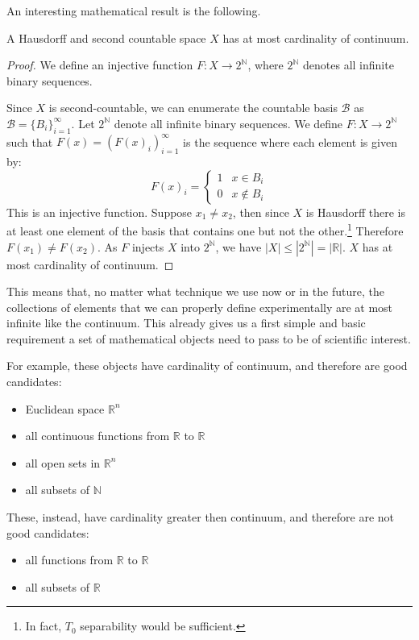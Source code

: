 \documentclass[11pt,letterpaper,fleqn]{memoir} %
\begin{document}
An interesting mathematical result is the following.

\begin{prop}
	A Hausdorff and second countable space $X$ has at most cardinality of continuum.
\end{prop}

\begin{proof}
	We define an injective function $F:X\to2^{\mathbb{N}}$, where $2^{\mathbb{N}}$ denotes all infinite binary sequences.
	
	Since $X$ is second-countable, we can enumerate the countable basis $\mathcal{B}$ as $\mathcal{B} = \{B_i\}_{i=1}^{\infty}$. Let $2^{\mathbb{N}}$ denote all infinite binary sequences. We define $F:X\to2^{\mathbb{N}}$ such that $F(x) = (F(x)_i)_{i=1}^{\infty}$ is the sequence where each element is given by: 
	$$
	F(x)_i = 
	\begin{cases}
	1 & x\in B_i \\
	0 & x\notin B_i
	\end{cases}
	$$
	This is an injective function. Suppose $x_1 \neq x_2$, then since $X$ is Hausdorff there is at least one element of the basis that contains one but not the other.\footnote{In fact, $T_0$ separability would be sufficient.} Therefore $F(x_1) \neq F(x_2)$. As $F$ injects $X$ into $2^{\mathbb{N}}$, we have $|X| \leq |2^{\mathbb{N}}|=|\mathbb{R}|$. $X$ has at most cardinality of continuum.
\end{proof}

This means that, no matter what technique we use now or in the future, the collections of elements that we can properly define experimentally are at most infinite like the continuum. This already gives us a first simple and basic requirement a set of mathematical objects need to pass to be of scientific interest.

For example, these objects have cardinality of continuum, and therefore are good candidates:
\begin{itemize}
	\item Euclidean space $\mathbb{R}^n$
	\item all continuous functions from $\mathbb{R}$ to $\mathbb{R}$
	\item all open sets in $\mathbb{R}^n$
	\item all subsets of $\mathbb{N}$
\end{itemize}

These, instead, have cardinality greater then continuum, and therefore are not good candidates:
\begin{itemize}
	\item all functions from $\mathbb{R}$ to $\mathbb{R}$
	\item all subsets of $\mathbb{R}$
\end{itemize}
\end{document}
